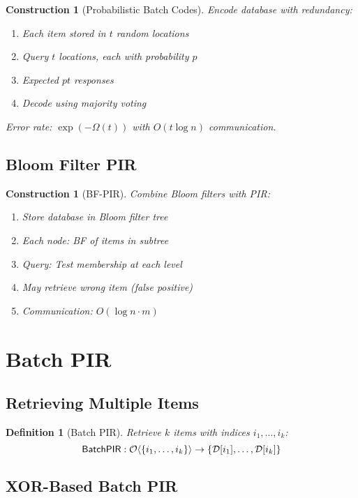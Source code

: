 \documentclass[11pt,final,hidelinks]{article}
\newcommand{\DB}{\mathcal{D}}
\newtheorem{definition}[theorem]{Definition}
\newtheorem{construction}[theorem]{Construction}
\begin{document}
\begin{construction}[Probabilistic Batch Codes]
Encode database with redundancy:
\begin{enumerate}
    \item Each item stored in $t$ random locations
    \item Query $t$ locations, each with probability $p$
    \item Expected $pt$ responses
    \item Decode using majority voting
\end{enumerate}
Error rate: $\exp(-\Omega(t))$ with $O(t \log n)$ communication.
\end{construction}

\subsection{Bloom Filter PIR}

\begin{construction}[BF-PIR]
Combine Bloom filters with PIR:
\begin{enumerate}
    \item Store database in Bloom filter tree
    \item Each node: BF of items in subtree
    \item Query: Test membership at each level
    \item May retrieve wrong item (false positive)
    \item Communication: $O(\log n \cdot m)$
\end{enumerate}
\end{construction}

\section{Batch PIR}

\subsection{Retrieving Multiple Items}

\begin{definition}[Batch PIR]
Retrieve $k$ items with indices $i_1, \ldots, i_k$:
\begin{equation}
\mathsf{BatchPIR}: \Obv{\{i_1, \ldots, i_k\}} \to \{\DB[i_1], \ldots, \DB[i_k]\}
\end{equation}
\end{definition}

\subsection{XOR-Based Batch PIR}
\end{document}
